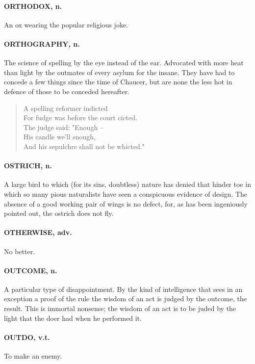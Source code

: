 \documentclass[11pt]{article}
\begin{document}
\paragraph{ORTHODOX, n.}  An ox wearing the popular religious joke.

\paragraph{ORTHOGRAPHY, n.}  The science of spelling by the eye instead of the
ear.  Advocated with more heat than light by the outmates of every
asylum for the insane.  They have had to concede a few things since
the time of Chaucer, but are none the less hot in defence of those to
be conceded hereafter.

\begin{quote}   A spelling reformer indicted \\
  For fudge was before the court cicted. \\
      The judge said:  "Enough -- \\
      His candle we'll snough, \\
  And his sepulchre shall not be whicted."
\end{quote}
\paragraph{OSTRICH, n.}  A large bird to which (for its sins, doubtless) nature
has denied that hinder toe in which so many pious naturalists have
seen a conspicuous evidence of design.  The absence of a good working
pair of wings is no defect, for, as has been ingeniously pointed out,
the ostrich does not fly.

\paragraph{OTHERWISE, adv.}  No better.

\paragraph{OUTCOME, n.}  A particular type of disappointment.  By the kind of
intelligence that sees in an exception a proof of the rule the wisdom
of an act is judged by the outcome, the result.  This is immortal
nonsense; the wisdom of an act is to be juded by the light that the
doer had when he performed it.

\paragraph{OUTDO, v.t.}  To make an enemy.
\end{document}
